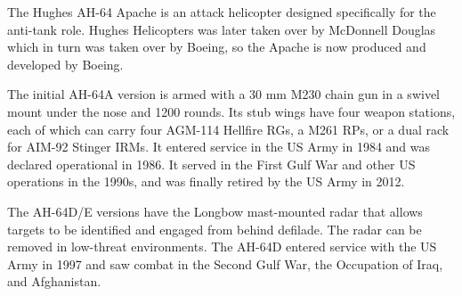 

The Hughes AH-64 Apache is an attack helicopter designed specifically for the anti-tank role. Hughes Helicopters was later taken over by McDonnell Douglas which in turn was taken over by Boeing, so the Apache is now produced and developed by Boeing.

The initial AH-64A version is armed with a 30 mm M230 chain gun in a swivel mount under the nose and 1200 rounds. Its stub wings have four weapon stations, each of which can carry four AGM-114 Hellfire RGs, a M261  RPs, or a dual rack for AIM-92 Stinger IRMs. It entered service in the US Army in 1984 and was declared operational in 1986. It served in the First Gulf War and other US operations in the 1990s, and was finally retired by the US Army in 2012.

The AH-64D/E versions have the Longbow mast-mounted radar that allows targets to be identified and engaged from behind defilade. The radar can be removed in low-threat environments. The AH-64D entered service with the US Army in 1997 and saw combat in the Second Gulf War, the Occupation of Iraq, and Afghanistan.

